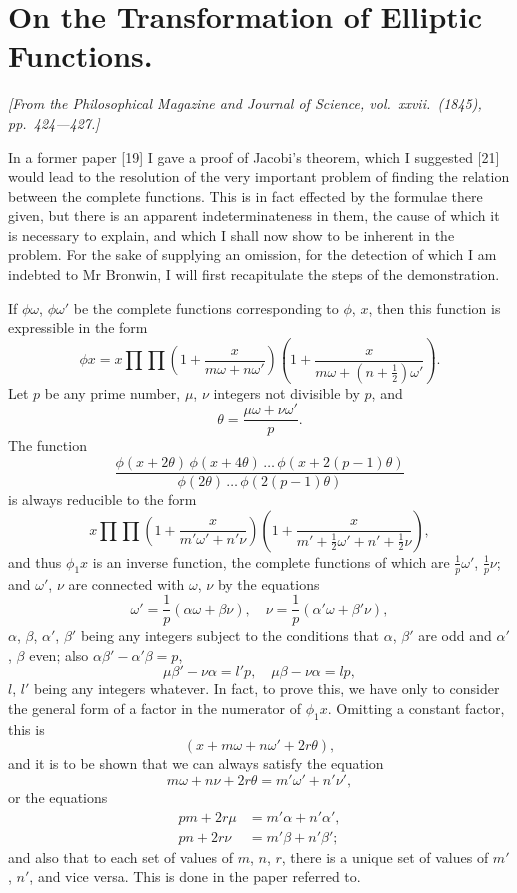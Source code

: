 \documentclass[11pt,a4paper]{book}
\begin{document}
\section*{On the Transformation of Elliptic Functions.}

\textit{[From the Philosophical Magazine and Journal of Science, vol.~xxvii.~(1845),}
\textit{pp.~424---427.]}

\bigskip
\setcounter{page}{132}

In a former paper [19] I gave a proof of Jacobi's theorem, which I suggested [21]
would lead to the resolution of the very important problem of finding the relation
between the complete functions. This is in fact effected by the formulae there given,
but there is an apparent indeterminateness in them, the cause of which it is necessary
to explain, and which I shall now show to be inherent in the problem. For the sake
of supplying an omission, for the detection of which I am indebted to Mr Bronwin,
I will first recapitulate the steps of the demonstration.

If $\phi\omega$, $\phi\omega'$ be the complete functions corresponding to $\phi$, $x$, then this function
is expressible in the form
\[
\phi x = x \prod \prod \left(1 + \frac{x}{m\omega + n\omega'}\right) \left(1 + \frac{x}{m\omega + (n + \frac{1}{2})\omega'}\right).
\]
Let $p$ be any prime number, $\mu$, $\nu$ integers not divisible by $p$, and
\[
\theta = \frac{\mu\omega + \nu\omega'}{p}.
\]
The function
\[
\frac{\phi(x + 2\theta)\, \phi(x + 4\theta)\, \ldots\, \phi(x + 2(p-1)\theta)}{\phi(2\theta)\, \ldots\, \phi(2(p-1)\theta)}
\]
is always reducible to the form
\[
x \prod \prod \left(1 + \frac{x}{m'\omega' + n'\nu}\right) \left(1 + \frac{x}{m' + \frac{1}{2}\omega' + n' + \frac{1}{2}\nu}\right),
\]
and thus $\phi_1 x$ is an inverse function, the complete functions of which are $\frac{1}{p}\omega'$, $\frac{1}{p}\nu$; and
$\omega'$, $\nu$ are connected with $\omega$, $\nu$ by the equations
\[
\omega' = \frac{1}{p}(\alpha\omega + \beta\nu),\quad
\nu = \frac{1}{p}(\alpha'\omega + \beta'\nu),
\]
$\alpha$, $\beta$, $\alpha'$, $\beta'$ being any integers subject to the conditions that $\alpha$, $\beta'$ are odd and $\alpha'$, $\beta$
even; also $\alpha\beta' - \alpha'\beta = p$,
\[
\mu\beta' - \nu\alpha = l'p,\quad
\mu\beta - \nu\alpha = lp,
\]
$l$, $l'$ being any integers whatever. In fact, to prove this, we have only to consider
the general form of a factor in the numerator of $\phi_1 x$. Omitting a constant factor,
this is
\[
(x + m\omega + n\omega' + 2r\theta),
\]
and it is to be shown that we can always satisfy the equation
\[
m\omega + n\nu + 2r\theta = m'\omega' + n'\nu',
\]
or the equations
\begin{align*}
pm + 2r\mu &= m'\alpha + n'\alpha',\\
pn + 2r\nu &= m'\beta + n'\beta';
\end{align*}
and also that to each set of values of $m$, $n$, $r$, there is a unique set of values of
$m'$, $n'$, and vice versa. This is done in the paper referred to.
\end{document}
